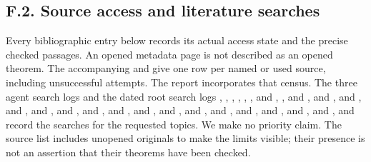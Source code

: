 \subsection{F.2. Source access and literature searches}
Every bibliographic entry below records its actual access state and the
precise checked passages. An opened metadata page is not described as
an opened theorem. The accompanying 
and  give one row per named or used source,
including unsuccessful attempts. The report incorporates that census.
The three agent search logs and the dated root search logs
, ,
, ,
, , and
, , and
, and
, and
, and
, and
, and
, and
, and
, and
, and
, and
, and
, and
, and
, and
, and
, and
record the searches for the requested topics. We make no priority claim.
The source list includes unopened originals to make the limits visible;
their presence is not an assertion that their theorems have been checked.
